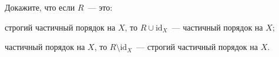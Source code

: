 Докажите, что если $R$~--- это:
\begin{enumcyr}
    \item строгий частичный порядок на $X$, то $R \cup \mathrm{id}_{X}$~--- частичный порядок на $X$;
    \item частичный порядок на $X$, то $R \setminus \mathrm{id}_{X}$~--- строгий частичный порядок на $X$.
\end{enumcyr}